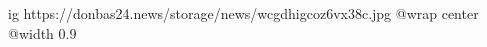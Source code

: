  
 
 
 
 

\ifcmt
  ig https://donbas24.news/storage/news/wcgdhigcoz6vx38c.jpg
  @wrap center
  @width 0.9
\fi
